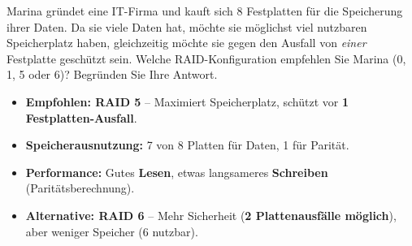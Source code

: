 \begin{myexercise}
    Marina gründet eine IT-Firma und kauft sich 8 Festplatten für die Speicherung ihrer Daten. Da sie viele Daten hat, möchte sie möglichst viel nutzbaren Speicherplatz haben, gleichzeitig möchte sie gegen den Ausfall von \textit{einer} Festplatte geschützt sein. Welche \acrshort{RAID}-Konfiguration empfehlen Sie Marina (0, 1, 5 oder 6)? Begründen Sie Ihre Antwort.
    \begin{myanswer}
        \begin{itemize}
            \item \textbf{Empfohlen: \gls{RAID} 5} -- Maximiert Speicherplatz, schützt vor \textbf{1 Festplatten-Ausfall}.
            \item \textbf{Speicherausnutzung:} 7 von 8 Platten für Daten, 1 für Parität.
            \item \textbf{Performance:} Gutes \textbf{Lesen}, etwas langsameres \textbf{Schreiben} (Paritätsberechnung).
            \item \textbf{Alternative: \gls{RAID} 6} -- Mehr Sicherheit (\textbf{2 Plattenausfälle möglich}), aber weniger Speicher (6 nutzbar).
        \end{itemize}
    \end{myanswer}


\end{myexercise}

